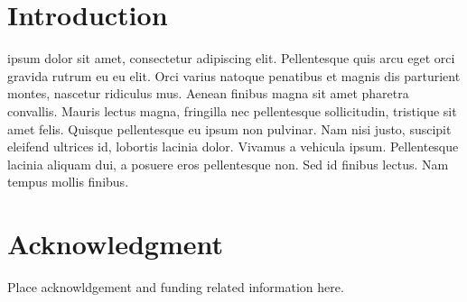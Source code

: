\documentclass[10pt,journal]{IEEEtran}
\begin{document}
\section{Introduction}
\label{sec:introduction}
\fi

 ipsum dolor sit amet, consectetur adipiscing elit. Pellentesque quis arcu eget orci gravida rutrum eu eu elit. Orci varius natoque penatibus et magnis dis parturient montes, nascetur ridiculus mus. Aenean finibus magna sit amet pharetra convallis. Mauris lectus magna, fringilla nec pellentesque sollicitudin, tristique sit amet felis. Quisque pellentesque eu ipsum non pulvinar. Nam nisi justo, suscipit eleifend ultrices id, lobortis lacinia dolor. Vivamus a vehicula ipsum. Pellentesque lacinia aliquam dui, a posuere eros pellentesque non. Sed id finibus lectus. Nam tempus mollis finibus. ~\cite{Newton.1883}

\section*{Acknowledgment}
Place acknowldgement and funding related information here.

\ifCLASSOPTIONcaptionsoff
\newpage
\fi



\end{document}

